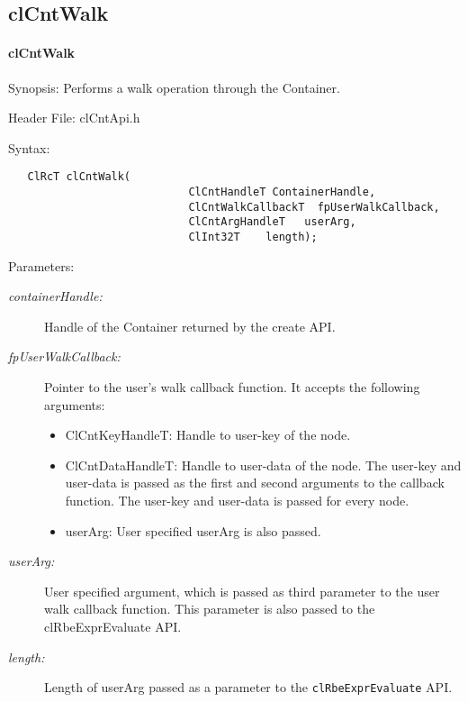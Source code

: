 \subsection{clCntWalk}
\hypertarget{pagecnt114}{}\paragraph{cl\-Cnt\-Walk}\label{pagecnt114}
\begin{Desc}
\item[Synopsis:]Performs a walk operation through the Container.\end{Desc}
\begin{Desc}
\item[Header File:]clCntApi.h\end{Desc}
\begin{Desc}
\item[Syntax:]

\footnotesize\begin{verbatim}   ClRcT clCntWalk(
              				ClCntHandleT ContainerHandle,
              				ClCntWalkCallbackT  fpUserWalkCallback,
              				ClCntArgHandleT   userArg,
              				ClInt32T    length);
\end{verbatim}
\normalsize
\end{Desc}
\begin{Desc}
\item[Parameters:]
\begin{description}
\item[{\em containerHandle:}] Handle of the Container returned by the create API.
\item[{\em fpUserWalkCallback:}] Pointer to the user's walk callback function. It accepts the following arguments:
\begin{itemize}
\item
ClCntKeyHandleT: Handle to user-key of the node.
\item
ClCntDataHandleT: Handle to user-data of the node. The user-key and user-data is passed as the first and second arguments to the callback 
function. The user-key and user-data is passed for every node.
\item
userArg: User specified userArg is also passed.
\end{itemize}
\item[{\em userArg:}] User specified argument, which is passed as third parameter  to the user walk callback function. This parameter is also passed to 
the clRbeExprEvaluate API.

\item[{\em length:}] Length of userArg passed as a parameter to the {\tt{clRbeExprEvaluate}} API.

\end{description}
\end{Desc}

